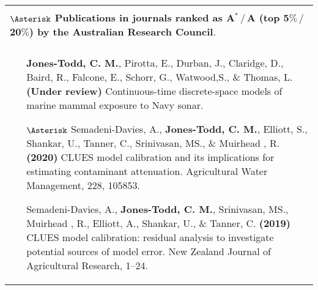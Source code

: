 \documentclass[12pt, a4paper]{article}
\begin{document}
\begin{center}\begin{longtable}{|p{16.3 cm}|}
\hline \cellcolor[gray]{0.8}{\bf 2a.  Research publications and dissemination}  \\
{\bf $\Asterisk$ Publications in journals ranked as A${}^\ast\,/\,$A (top 5$\%\,/\,$20$\%$) by the Australian Research Council}.\\
\hline \cellcolor[gray]{0.8}{Peer reviewed journal articles}  \\
\hline
\begin{itemize}
\item[] {\bf Jones-Todd, C. M.}, Pirotta, E., Durban, J., Claridge, D., Baird, R., Falcone, E., Schorr, G., Watwood,S., \& Thomas, L.  \textbf{(Under review)} Continuous-time discrete-space models of marine mammal exposure to Navy sonar.
\item[$\Asterisk$] Semadeni-Davies, A., {\bf Jones-Todd, C. M.},  Elliott, S., Shankar, U., Tanner, C., Srinivasan, MS., \& Muirhead , R. {\bf(2020)} CLUES model calibration and its implications for estimating contaminant attenuation. Agricultural Water Management, 228, 105853.
  \item[] Semadeni-Davies, A., \textbf{Jones-Todd, C. M.}, Srinivasan, MS.,  Muirhead , R.,  Elliott, A., Shankar, U., \& Tanner, C. \textbf{(2019)} CLUES model calibration: residual analysis to investigate potential sources of model error. New Zealand Journal of Agricultural Research, 1--24.

\end{itemize}
\end{longtable}
\end{center}
\end{document}
